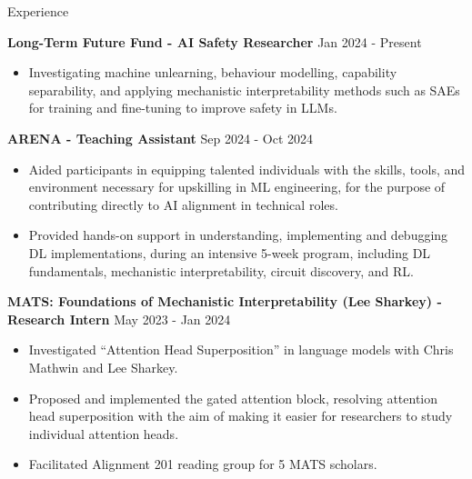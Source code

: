 \documentclass[hidelinks]{resume} %
\begin{document}
\begin{rSection}{Experience}
    
\textbf{Long-Term Future Fund - AI Safety Researcher}
\hfill {Jan 2024 - Present}
\begin{itemize}
    \item Investigating machine unlearning, behaviour modelling, capability separability, and applying mechanistic interpretability methods such as SAEs for training and fine-tuning to improve safety in LLMs.
\end{itemize}

\textbf{ARENA - Teaching Assistant}
\hfill{Sep 2024 - Oct 2024}
\begin{itemize}
    \item Aided participants in equipping talented individuals with the skills, tools, and environment necessary for upskilling in ML engineering, for the purpose of contributing directly to AI alignment in technical roles.
    \item Provided hands-on support in understanding, implementing and debugging DL implementations, during an intensive 5-week program, including DL fundamentals, mechanistic interpretability, circuit discovery, and RL.
\end{itemize}

\textbf{MATS: Foundations of Mechanistic Interpretability (Lee Sharkey) - Research Intern}
\hfill {May 2023 - Jan 2024}
\begin{itemize}
    \item Investigated ``Attention Head Superposition'' in language models with Chris Mathwin and Lee Sharkey.
    \item Proposed and implemented the gated attention block, resolving attention head superposition with the aim of making it easier for researchers to study individual attention heads.
    \item Facilitated Alignment 201 reading group for 5 MATS scholars.
\end{itemize}


\end{rSection}
\end{document}

